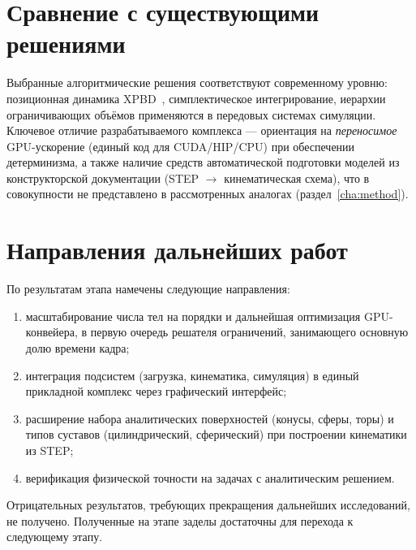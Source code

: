 \section{Сравнение с существующими решениями}

Выбранные алгоритмические решения соответствуют современному уровню: позиционная
динамика XPBD~\cite{macklin2016xpbd}, симплектическое интегрирование, иерархии
ограничивающих объёмов применяются в передовых системах симуляции. Ключевое
отличие разрабатываемого комплекса --- ориентация на \emph{переносимое}
GPU-ускорение (единый код для CUDA/HIP/CPU) при обеспечении детерминизма, а также
наличие средств автоматической подготовки моделей из конструкторской
документации (STEP $\rightarrow$ кинематическая схема), что в совокупности не
представлено в рассмотренных аналогах (раздел~\ref{cha:method}).

\section{Направления дальнейших работ}

По результатам этапа намечены следующие направления:
\begin{enumerate}
  \item масштабирование числа тел на порядки и дальнейшая оптимизация
        GPU-конвейера, в первую очередь решателя ограничений, занимающего
        основную долю времени кадра;
  \item интеграция подсистем (загрузка, кинематика, симуляция) в единый
        прикладной комплекс через графический интерфейс;
  \item расширение набора аналитических поверхностей (конусы, сферы, торы) и
        типов суставов (цилиндрический, сферический) при построении кинематики
        из STEP;
  \item верификация физической точности на задачах с аналитическим решением.
\end{enumerate}

Отрицательных результатов, требующих прекращения дальнейших исследований, не
получено. Полученные на этапе заделы достаточны для перехода к следующему этапу.
